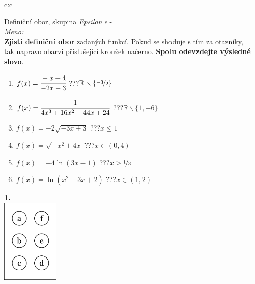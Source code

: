 \documentclass[10pt]{report}
\begin{document}
\begin{tabular}{c:c}
\begin{minipage}[c][99mm][t]{0.49\linewidth}
\begin{center}
\vspace{7mm}
{\huge Definiční obor, skupina \textit{Epsilon $\epsilon$} -}\\[4.5mm]
\textit{Meno:}\phantom{xxxxxxxxxxxxxxxxxxxxxxxxxxxxxxxxxxxxxxxxxxxxxxxxxxxxxxxxxxxxxxxxx}\\[3.5mm]
\textbf{Zjisti definiční obor} zadaných funkcí. Pokud se shoduje s tím za otazníky,\\tak napravo obarvi příslušející kroužek načerno. \textbf{Spolu odevzdejte výsledné slovo}.\\[3mm]
\begin{minipage}{0.77\linewidth}
\begin{center}
\begin{varwidth}{\textwidth}
\begin{enumerate}
\normalsize
\item $f(x)=\cfrac{-x+4}{-2x-3}$\quad \dotfill\; ???\;\dotfill \quad $\mathbb{R}\smallsetminus\{\nicefrac{-3}{2}\}$
\item $f(x)=\cfrac{1}{4x^3+16x^2-44x+24}$\quad \dotfill\; ???\;\dotfill \quad $\mathbb{R}\smallsetminus\{1,-6\}$
\item $f(x)=-2\sqrt{-3x+3}$\quad \dotfill\; ???\;\dotfill \quad $x\leq1$
\item $f(x)=\sqrt{-x^2+4x}$\quad \dotfill\; ???\;\dotfill \quad $x\in(0 , 4)$
\item $f(x)=-4\ln{(3x-1)}$\quad \dotfill\; ???\;\dotfill \quad $x>\nicefrac{1}{3}$
\item $f(x)=\ln{(x^2-3x+2)}$\quad \dotfill\; ???\;\dotfill \quad $x\in(1 , 2)$
\end{enumerate}
\end{varwidth}
\end{center}
\end{minipage}
\begin{minipage}{0.20\linewidth}
\begin{center}
{\Huge\bfseries 1.} \\[2mm]
\includegraphics[height=40mm]{../images/braille.png}

\end{center}
\end{minipage}
\end{center}
\end{minipage}
\end{tabular}
\end{document}
